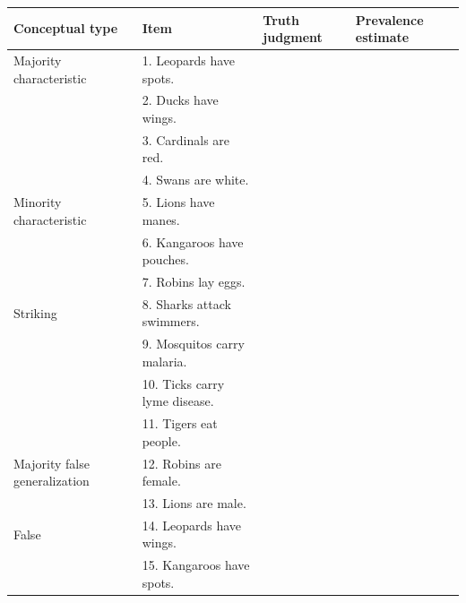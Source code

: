 \documentclass[10pt,letterpaper]{article}
\begin{document}
\begin{table}[h]
\begin{tabular}{| l || l | l | l |}
\hline
Conceptual type               & Item                    & Truth judgment & Prevalence estimate \\
\hline \hline
Majority characteristic       & 1. Leopards have spots.    &                &                     \\
                                          & 2. Ducks have wings.                       &                &                     \\
                                          & 3. Cardinals are red.                       &                &                     \\
                                          & 4. Swans are white.                       &                &                     \\
Minority characteristic       & 5. Lions have manes.       &                &                     \\
                                          & 6. Kangaroos have pouches.                        &                &                     \\
                                          & 7. Robins lay eggs.                        &                &                     \\
Striking                      & 8. Sharks attack swimmers. &                &                     \\
                                  & 9. Mosquitos carry malaria.                        &                &                     \\
                                  & 10. Ticks carry lyme disease.                        &                &                     \\
                                  & 11. Tigers eat people.                        &                &                     \\
Majority false generalization & 12. Robins are female.      &                &                     \\
                                              & 13.  Lions are male.                       &                &                     \\
False                         & 14. Leopards have wings.       &                &                    \\
                                              & 15. Kangaroos have spots.                       &                &                     \\

\end{tabular}
\end{table}
\end{document}
